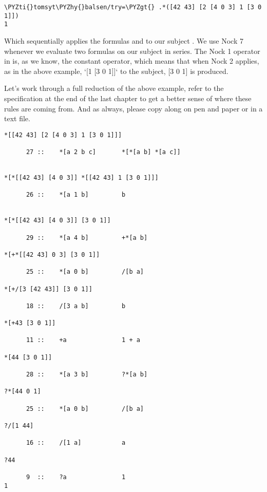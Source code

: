 \begin{framed_shaded}
\begin{Verbatim}[fontsize=\relsize{-2.5},fontseries=b,commandchars=\\\{\}]
\PYZti{}tomsyt\PYZhy{}balsen/try=\PYZgt{} .*([42 43] [2 [4 0 3] 1 [3 0 1]])
1
\end{Verbatim}
\end{framed_shaded}
Which sequentially applies the formulas \kode{[4 0 3]} and \kode{[3 0 1]} to our subject \kode{[42 43]}. We use Nock 7 whenever we evaluate two formulas on our subject in series. The Nock 1 operator in \kode{*[a 2 b 1 c]} is, as we know, the constant operator, which means that when Nock 2 applies, as in the above example, `[1 [3 0 1]]` to the subject, [3 0 1] is produced.

Let's work through a full reduction of the above example, refer to the specification at the end of the last chapter to get a better sense of where these rules are coming from. And as always, please copy along on pen and paper or in a text file.

\begin{framed_shaded}
\begin{Verbatim}[fontsize=\relsize{-2.5},fontseries=b,commandchars=\\\{\}]
*[[42 43] [2 [4 0 3] 1 [3 0 1]]]

      27 ::    *[a 2 b c]       *[*[a b] *[a c]]


*[*[[42 43] [4 0 3]] *[[42 43] 1 [3 0 1]]]

      26 ::    *[a 1 b]         b


*[*[[42 43] [4 0 3]] [3 0 1]]

      29 ::    *[a 4 b]         +*[a b]

*[+*[[42 43] 0 3] [3 0 1]]

      25 ::    *[a 0 b]         /[b a]

*[+/[3 [42 43]] [3 0 1]]

      18 ::    /[3 a b]         b

*[+43 [3 0 1]]

      11 ::    +a               1 + a

*[44 [3 0 1]]

      28 ::    *[a 3 b]         ?*[a b]

?*[44 0 1]

      25 ::    *[a 0 b]         /[b a]

?/[1 44]

      16 ::    /[1 a]           a

?44

      9  ::    ?a               1
1
\end{Verbatim}
\end{framed_shaded}

